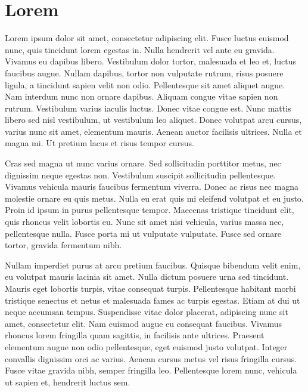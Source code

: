 \chapter{Lorem}

Lorem ipsum dolor sit amet, consectetur adipiscing elit. Fusce luctus
euismod nunc, quis tincidunt lorem egestas in. Nulla hendrerit vel
ante eu gravida. Vivamus eu dapibus libero. Vestibulum dolor tortor,
malesuada et leo et, luctus faucibus augue. Nullam dapibus, tortor non
vulputate rutrum,  risus posuere ligula, a
tincidunt sapien velit non odio. Pellentesque sit amet aliquet augue.
Nam interdum nunc non ornare dapibus. Aliquam congue vitae sapien non
rutrum. Vestibulum varius iaculis luctus. Donec vitae congue est. Nunc
mattis libero sed nisl vestibulum, ut vestibulum leo aliquet. Donec
volutpat arcu cursus, varius nunc sit amet, elementum mauris. Aenean
auctor facilisis ultrices. Nulla et magna mi. Ut pretium lacus et
risus tempor cursus.

 Cras sed magna ut nunc varius ornare. Sed sollicitudin porttitor
 metus, nec dignissim neque egestas non. Vestibulum suscipit
 sollicitudin pellentesque. Vivamus vehicula mauris faucibus fermentum
 viverra. Donec ac risus nec magna molestie ornare eu quis metus.
 Nulla eu erat quis mi eleifend volutpat et eu justo. Proin id ipsum
 in purus pellentesque tempor. Maecenas tristique tincidunt elit, quis
 rhoncus velit lobortis eu. Nunc sit amet nisi vehicula, varius massa
 nec, pellentesque nulla. Fusce porta mi ut vulputate vulputate. Fusce
 sed ornare tortor, gravida fermentum nibh.

Nullam imperdiet purus at arcu pretium faucibus. Quisque bibendum
velit enim, eu volutpat mauris lacinia sit amet. Nulla dictum posuere
urna sed tincidunt. Mauris eget lobortis turpis, vitae consequat
turpis. Pellentesque habitant morbi tristique senectus et netus et
malesuada fames ac turpis egestas. Etiam at dui ut neque accumsan
tempus. Suspendisse vitae dolor placerat, adipiscing nunc sit amet,
consectetur elit. Nam euismod augue eu consequat faucibus. Vivamus
rhoncus lorem fringilla quam sagittis, in facilisis ante ultrices.
Praesent elementum augue non odio pellentesque, eget euismod justo
volutpat. Integer convallis dignissim orci ac varius. Aenean cursus
metus vel risus fringilla cursus. Fusce vitae gravida nibh, semper
fringilla leo. Pellentesque lorem nunc, vehicula ut sapien et,
hendrerit luctus sem.

